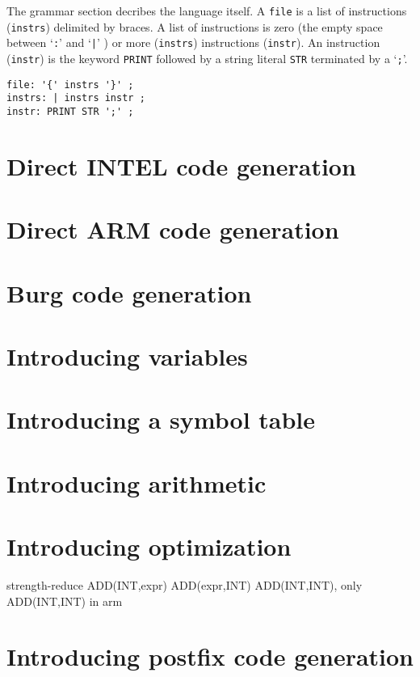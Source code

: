 \documentclass[a4paper]{article}
\begin{document}
The grammar section decribes the language itself.
A {\tt file} is a list of instructions ({\tt instrs}) delimited by braces.
A list of instructions is zero (the empty space between `{\tt :}' and `{\tt |}' ) or more ({\tt instrs}) instructions ({\tt instr}).
An instruction ({\tt instr}) is the keyword {\tt PRINT} followed by a string literal {\tt STR} terminated by a  `{\tt ;}'.
\begin{verbatim}
file: '{' instrs '}' ;
instrs: | instrs instr ;
instr: PRINT STR ';' ;
\end{verbatim}

\section{Direct {\sc INTEL} code generation} %


\section{Direct {\sc ARM} code generation} %
\section{Burg code generation} %
\section{Introducing variables} %
\section{Introducing a symbol table} %
\section{Introducing arithmetic} %
\section{Introducing optimization} %
strength-reduce ADD(INT,expr) ADD(expr,INT) ADD(INT,INT),
only ADD(INT,INT) in arm
\section{Introducing postfix code generation} %
\end{document}
